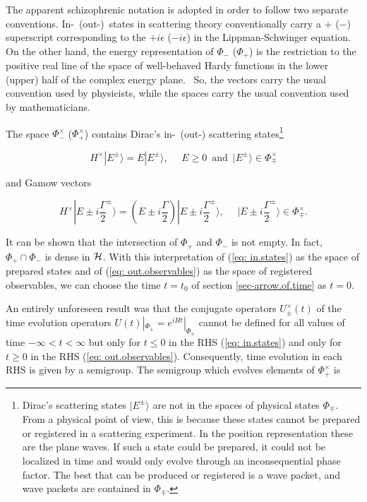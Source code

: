 \documentclass[12pt]{article}
\begin{document}
\noindent The apparent schizophrenic notation is adopted in order to follow two separate conventions.  In-~(out-)~states in scattering theory conventionally carry a $+$ ($-$) superscript corresponding to the $+i\epsilon$ ($-i\epsilon$) in the Lippman-Schwinger equation.  On the other hand, the energy representation of $\Phi_-$ ($\Phi_+$) is the restriction to the positive real line of the space of well-behaved Hardy functions in the lower (upper) half of the complex energy plane.~\cite{Baumgartel}  So, the vectors carry the usual convention used by physicists, while the spaces carry the usual convention used by mathematicians.

The space $\Phi_-^{\times}$ ($\Phi_+^{\times}$) contains Dirac's in-~(out-) scattering states\footnote{Dirac's scattering states $|E^{\pm}\rangle$ are not in the spaces of physical states $\Phi_{\mp}$.  From a physical point of view, this is because these states cannot be prepared or registered in a scattering experiment.  In the position representation these are the plane waves.  If such a state could be prepared, it could not be localized in time and would only evolve through an inconsequential phase factor.  The best that can be produced or registered is a wave packet, and wave packets are contained in ${\Phi_{\mp}}$.}

\begin{equation}
H^{\times}|E^{\pm}\rangle = E|E^{\pm}\rangle, \,\,\,\,\,\,\,\, E \geq 0 \,\,\, \mbox{and} \,\,\, |E^{\pm}\rangle \in \Phi_{\mp}^{\times}
\end{equation}

\noindent and Gamow vectors

\begin{equation}
H^{\times}|E \pm i\frac{\Gamma}{2}^{\pm}\rangle = (E \pm i\frac{\Gamma}{2})|E \pm i\frac{\Gamma}{2}^{\pm}\rangle, \,\,\,\,\,\,\,\, |E \pm i\frac{\Gamma}{2}^{\pm}\rangle \in \Phi_{\mp}^{\times}.  \label{eq: Gamow.vector}
\end{equation}

\noindent It can be shown that the intersection of $\Phi_+$ and $\Phi_-$ is not empty.  In fact, $\Phi_+ \cap \Phi_-$ is dense in ${\cal H}$.  With this interpretation of (\ref{eq: in.states}) as the space of prepared states and of (\ref{eq: out.observables}) as the space of registered observables, we can choose the time $t=t_0$ of section \ref{sec-arrow.of.time} as $t=0$.~\cite{Bohm.et.al}

An entirely unforeseen result \cite{semigroup.discovery} was that the conjugate operators $U^{\times}_{\pm}(t)$ of the time evolution operators $U(t)|_{\Phi_{\pm}} = e^{iHt}|_{\Phi_{\pm}}$ cannot be defined for all values of time $-\infty < t < \infty$ but only for $t \leq 0$ in the RHS (\ref{eq: in.states}) and only for $t \geq 0$ in the RHS (\ref{eq: out.observables}).  Consequently, time evolution in each RHS is given by a semigroup.  The semigroup which evolves elements of $\Phi_+^{\times}$ is
\end{document}

